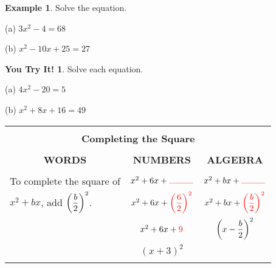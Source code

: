 \documentclass{report}
\theoremstyle{definition}
\newtheorem{example}{\bf Example}
\newtheorem{youtry}{\textbf{You Try It!}}
\begin{document}
\begin{example}
Solve the equation.
\end{example}


\begin{minipage}[t]{0.45\linewidth}
(a)  $3x^2-4=68$
\end{minipage}
\hfill
\begin{minipage}[t]{0.45\linewidth}
(b)  $x^2-10x+25=27$
\end{minipage}

\vfill


\begin{youtry}
Solve each equation.
\end{youtry}

\begin{minipage}[t]{0.45\linewidth}
(a)  $4x^2-20=5$
\end{minipage}
\hfill
\begin{minipage}[t]{0.45\linewidth}
(b)  $x^2+8x+16=49$
\end{minipage}


\vfill

\vspace{-0.5cm}

\begin{center}
	\begin{tabular}{|l|l|l|}
		\hline
		\multicolumn{3}{|l|}{}\\
		\multicolumn{3}{|c|}{\large\textbf{Completing the Square} \normalsize}\\
		\hline
		&&\\
		\multicolumn{1}{|c|}{\textbf{WORDS}}&\multicolumn{1}{c|}{\textbf{NUMBERS}}&\multicolumn{1}{c|}{\textbf{ALGEBRA}}\\
		\hline
		&&\\
		To complete the square of& \multicolumn{1}{c|}{ \qquad $x^2+6x+\color{red}\rule{1cm}{0.01cm}\color{black}$ \qquad \qquad} &  \multicolumn{1}{c|}{\qquad $x^2+bx+\color{red}\rule{1cm}{0.01cm}\color{black}$ \qquad \qquad}\\
		$x^2+bx$, add $\displaystyle\bigg{(}\frac{b}{2}\bigg{)}^2$. & \multicolumn{1}{c|}{$x^2+6x+\color{red}\bigg{(}\displaystyle\frac{6}{2}\bigg{)}^2\color{black}$} & \multicolumn{1}{c|}{$x^2+bx+\color{red}\bigg{(}\displaystyle\frac{b}{2}\bigg{)}^2\color{black}$} \\
		& \multicolumn{1}{c|}{$x^2+6x+\color{red}9\color{black}$} &  \multicolumn{1}{c|}{$\bigg{(}x-\displaystyle\frac{b}{2}\bigg{)}^2$}  \\
		& \multicolumn{1}{c|}{$(x+3)^2$ }& \\
		&& \\
		\hline
	\end{tabular}
\end{center}
\end{document}
